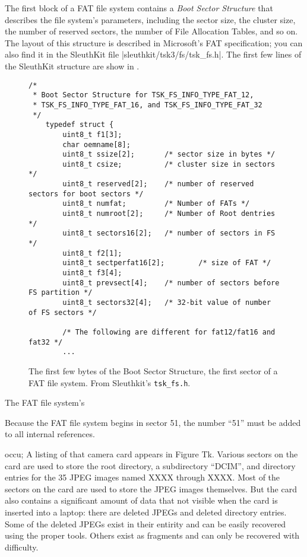 \label{mbrdecode}


The first block of a FAT file system contains a \emph{Boot Sector
  Structure} that describes the file system's parameters, including
the sector size, the cluster size, the number of reserved sectors, the
number of File Allocation Tables, and so on. The layout of this
structure is described in Microsoft's FAT specification; you can also
find it in the SleuthKit file |sleuthkit/tsk3/fs/tsk_fs.h|. The first
few lines of the SleuthKit structure are show in .

\begin{figure}
\begin{lstlisting}
/*
 * Boot Sector Structure for TSK_FS_INFO_TYPE_FAT_12,
 * TSK_FS_INFO_TYPE_FAT_16, and TSK_FS_INFO_TYPE_FAT_32
 */
    typedef struct {
        uint8_t f1[3];
        char oemname[8];
        uint8_t ssize[2];       /* sector size in bytes */
        uint8_t csize;          /* cluster size in sectors */
        uint8_t reserved[2];    /* number of reserved sectors for boot sectors */
        uint8_t numfat;         /* Number of FATs */
        uint8_t numroot[2];     /* Number of Root dentries */
        uint8_t sectors16[2];   /* number of sectors in FS */
        uint8_t f2[1];
        uint8_t sectperfat16[2];        /* size of FAT */
        uint8_t f3[4];
        uint8_t prevsect[4];    /* number of sectors before FS partition */
        uint8_t sectors32[4];   /* 32-bit value of number of FS sectors */

        /* The following are different for fat12/fat16 and fat32 */
        ...
\end{lstlisting}
\caption{The first few bytes of the Boot Sector Structure, the first
  sector of a FAT file system. From Sleuthkit's \texttt{tsk\_fs.h}.\label{BSS}}
\end{figure}

The FAT file system's 

Because the FAT file system begins in sector 51, the number ``51''
must be added to all internal references.

occu; A listing of
that camera card appears in Figure Tk. Various sectors on the card are
used to store the root directory, a subdirectory ``DCIM'', and
directory entries for the 35 JPEG
images named XXXX through XXXX. Most of the sectors on the card are
used to store the JPEG images themselves. But the card also contains a
significant amount of data that not visible when the card is
inserted into a laptop: there are deleted JPEGs and deleted directory
entries. Some of the deleted JPEGs exist in their entirity and can be
easily recovered using the proper tools. Others exist as fragments and
can only be recovered with difficulty. 

